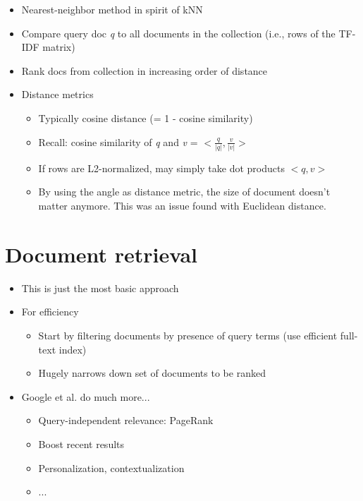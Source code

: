 \documentclass[11pt]{article}
\begin{document}
\begin{itemize}
	\item Nearest-neighbor method in spirit of kNN
	\item Compare query doc \textit{q} to all documents in the collection (i.e., rows of the TF-IDF matrix)
	\item Rank docs from collection in increasing order of distance
	\item Distance metrics
		\begin{itemize}
			\item Typically cosine distance (= 1 - cosine similarity)
			\item Recall: cosine similarity of \textit{q} and \textit{v} = $<\frac{q}{|q|}, \frac{v}{|v|}>$
			\item If rows are L2-normalized, may simply take dot products $<q, v>$
			\item By using the angle as distance metric, the size of document doesn't matter anymore. This was an issue found with Euclidean distance. 
		\end{itemize}
\end{itemize}

\section*{Document retrieval}
\begin{itemize}
	\item This is just the most basic approach
	\item For efficiency
		\begin{itemize}
			\item Start by filtering documents by presence of query terms (use efficient full-text index)
			\item Hugely narrows down set of documents to be ranked
		\end{itemize}
	\item Google et al. do much more...
		\begin{itemize}
			\item Query-independent relevance: PageRank
			\item Boost recent results
			\item Personalization, contextualization
			\item ...
		\end{itemize}
\end{itemize}

\vspace{0.5cm}
\end{document}
